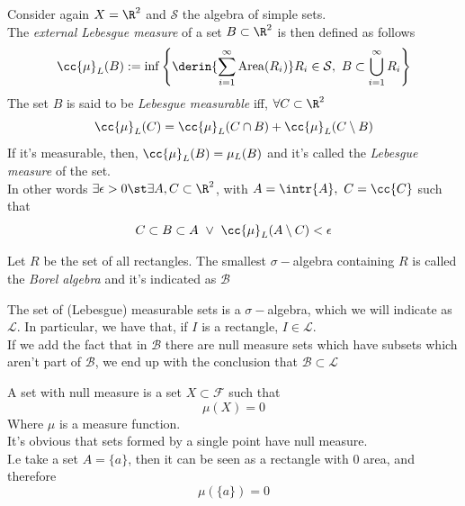 \documentclass[../mmf.tex]{subfiles}
\begin{document}
\begin{dfn}
	Consider again $X=\R^2$ and $\mathcal{S}$ the algebra of simple sets.\\
	The \textit{external Lebesgue measure} of a set $B\subset\R^2$ is then defined as follows
	\begin{equation}
		\cc{\mu}_L(B):=\inf\left\{ \derin{\sum_{i=1}^\infty\mathrm{Area}(R_i)} R_i\in\mathcal{S},\ B\subset\bigcup_{i=1}^\infty R_i \right\}
		\label{eq:upperlebmeas}
	\end{equation}
	The set $B$ is said to be \textit{Lebesgue measurable} iff, $\forall C\subset\R^2$
	\begin{equation}
		\cc{\mu}_L(C)=\cc{\mu}_L(C\cap B)+\cc{\mu}_L(C\setminus B)
		\label{eq:lebmeasset}
	\end{equation}
	If it's measurable, then, $\cc{\mu}_L(B)=\mu_L(B)$ and it's called the \textit{Lebesgue measure} of the set.\\
	In other words $\exists\epsilon>0\st\exists A,C\subset\R^2$, with $A=\intr{A},\ C=\cc{C}$ such that
	\begin{equation}
		C\subset B\subset A\ \vee\ \cc{\mu}_L(A\setminus C)<\epsilon
		\label{eq:formlebmeas}
	\end{equation}
\end{dfn}
\begin{dfn}
	Let $R$ be the set of all rectangles. The smallest $\sigma-$algebra containing $R$ is called the \textit{Borel algebra} and it's indicated as $\mathcal{B}$
\end{dfn}
\begin{dfn}
	The set of (Lebesgue) measurable sets is a $\sigma-$algebra, which we will indicate as $\mathcal{L}$. In particular, we have that, if $I$ is a rectangle, $I\in\mathcal{L}$.\\
	If we add the fact that in $\mathcal{B}$ there are null measure sets which have subsets which aren't part of $\mathcal{B}$, we end up with the conclusion that $\mathcal{B}\subset\mathcal{L}$
\end{dfn}
\begin{dfn}
	A set with null measure is a set $X\subset\mathcal{F}$ such that
	\begin{equation}
		\mu(X)=0
		\label{eq:nullmeas}
	\end{equation}
	Where $\mu$ is a measure function.\\
	It's obvious that sets formed by a single point have null measure.\\
	I.e take a set $A=\{a\}$, then it can be seen as a rectangle with $0$ area, and therefore
	\begin{equation}
		\mu\left( \{a\} \right)=0
		\label{eq:singlepointmeas}
	\end{equation}
\end{dfn}
\end{document}
